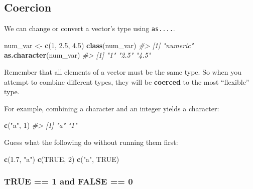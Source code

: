 \documentclass[
]{book}
\newenvironment{Shaded}{\begin{snugshade}}{\end{snugshade}}
\newcommand{\CommentTok}[1]{\textcolor[rgb]{0.56,0.35,0.01}{\textit{#1}}}
\newcommand{\DecValTok}[1]{\textcolor[rgb]{0.00,0.00,0.81}{#1}}
\newcommand{\FloatTok}[1]{\textcolor[rgb]{0.00,0.00,0.81}{#1}}
\newcommand{\KeywordTok}[1]{\textcolor[rgb]{0.13,0.29,0.53}{\textbf{#1}}}
\newcommand{\NormalTok}[1]{#1}
\newcommand{\OtherTok}[1]{\textcolor[rgb]{0.56,0.35,0.01}{#1}}
\newcommand{\StringTok}[1]{\textcolor[rgb]{0.31,0.60,0.02}{#1}}
\begin{document}
\hypertarget{coercion-1}{%
\subsection{Coercion}\label{coercion-1}}

We can change or convert a vector's type using \texttt{as....}.

\begin{Shaded}
\begin{Highlighting}[]
\NormalTok{num_var <-}\StringTok{ }\KeywordTok{c}\NormalTok{(}\DecValTok{1}\NormalTok{, }\FloatTok{2.5}\NormalTok{, }\FloatTok{4.5}\NormalTok{)}
\KeywordTok{class}\NormalTok{(num_var)}
\CommentTok{#> [1] "numeric"}
\KeywordTok{as.character}\NormalTok{(num_var)}
\CommentTok{#> [1] "1"   "2.5" "4.5"}
\end{Highlighting}
\end{Shaded}

Remember that all elements of a vector must be the same type. So when you attempt to combine different types, they will be \textbf{coerced} to the most ``flexible'' type.

For example, combining a character and an integer yields a character:

\begin{Shaded}
\begin{Highlighting}[]
\KeywordTok{c}\NormalTok{(}\StringTok{"a"}\NormalTok{, }\DecValTok{1}\NormalTok{)}
\CommentTok{#> [1] "a" "1"}
\end{Highlighting}
\end{Shaded}

Guess what the following do without running them first:

\begin{Shaded}
\begin{Highlighting}[]
\KeywordTok{c}\NormalTok{(}\FloatTok{1.7}\NormalTok{, }\StringTok{"a"}\NormalTok{) }
\KeywordTok{c}\NormalTok{(}\OtherTok{TRUE}\NormalTok{, }\DecValTok{2}\NormalTok{) }
\KeywordTok{c}\NormalTok{(}\StringTok{"a"}\NormalTok{, }\OtherTok{TRUE}\NormalTok{) }
\end{Highlighting}
\end{Shaded}

\hypertarget{true-1-and-false-0}{%
\subsubsection*{TRUE == 1 and FALSE == 0}\label{true-1-and-false-0}}
\end{document}
